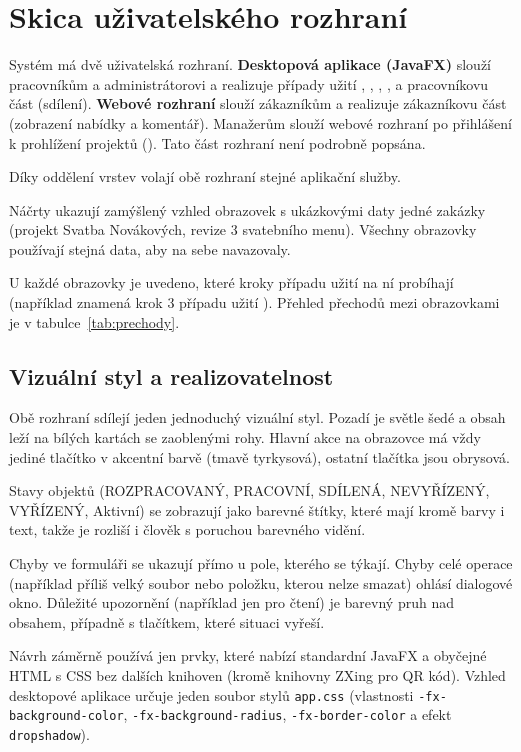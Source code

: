 \section{Skica uživatelského rozhraní}\label{sec:ui}

Systém má dvě uživatelská rozhraní. \textbf{Desktopová aplikace (JavaFX)} slouží pracovníkům a administrátorovi a realizuje případy užití , , , ,  a pracovníkovu část  (sdílení). \textbf{Webové rozhraní} slouží zákazníkům a realizuje zákazníkovu část  (zobrazení nabídky a komentář). Manažerům slouží webové rozhraní po přihlášení k prohlížení projektů (). Tato část rozhraní není podrobně popsána.

Díky oddělení vrstev volají obě rozhraní stejné aplikační služby.

Náčrty ukazují zamýšlený vzhled obrazovek s ukázkovými daty jedné zakázky (projekt Svatba Novákových, revize 3 svatebního menu). Všechny obrazovky používají stejná data, aby na sebe navazovaly.

U každé obrazovky je uvedeno, které kroky případu užití na ní probíhají (například  znamená krok 3 případu užití ). Přehled přechodů mezi obrazovkami je v tabulce~\ref{tab:prechody}.

\subsection{Vizuální styl a realizovatelnost}

Obě rozhraní sdílejí jeden jednoduchý vizuální styl. Pozadí je světle šedé a obsah leží na bílých kartách se zaoblenými rohy. Hlavní akce na obrazovce má vždy jediné tlačítko v akcentní barvě (tmavě tyrkysová), ostatní tlačítka jsou obrysová.

Stavy objektů (ROZPRACOVANÝ, PRACOVNÍ, SDÍLENÁ, NEVYŘÍZENÝ, VYŘÍZENÝ, Aktivní) se zobrazují jako barevné štítky, které mají kromě barvy i text, takže je rozliší i člověk s poruchou barevného vidění.

Chyby ve formuláři se ukazují přímo u pole, kterého se týkají. Chyby celé operace (například příliš velký soubor nebo položku, kterou nelze smazat) ohlásí dialogové okno. Důležité upozornění (například jen pro čtení) je barevný pruh nad obsahem, případně s tlačítkem, které situaci vyřeší.

Návrh záměrně používá jen prvky, které nabízí standardní JavaFX a obyčejné HTML s CSS bez dalších knihoven (kromě knihovny ZXing pro QR kód). Vzhled desktopové aplikace určuje jeden soubor stylů \texttt{app.css} (vlastnosti \texttt{-fx-background-color}, \texttt{-fx-background-radius}, \texttt{-fx-border-color} a efekt \texttt{dropshadow}).

